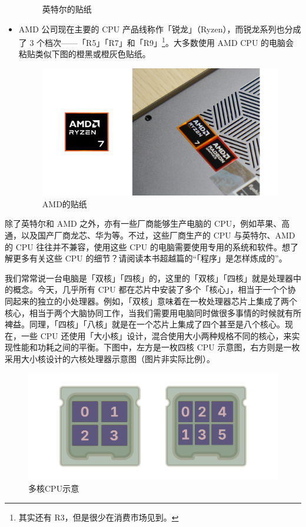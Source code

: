 \begin{itemize}
\begin{figure}[htb!]
      \caption{英特尔的贴纸}
      \label{fig:Intel_sticker}
    \end{figure}
  \item AMD 公司现在主要的 CPU 产品线称作「锐龙」（Ryzen），而锐龙系列也分成了 3 个档次——「R5」「R7」和「R9」\footnote{其实还有 R3，但是很少在消费市场见到。}。大多数使用 AMD CPU 的电脑会粘贴类似下图的橙黑或橙灰色贴纸。
    \begin{figure}[htb!]
      \centering
      \includegraphics[width=.6\textwidth]{assets/basic/AMD_sticker.png}
      \caption{AMD的贴纸}
      \label{fig:AMD_sticker}
    \end{figure}
\end{itemize}

\begin{note}
  除了英特尔和 AMD 之外，亦有一些厂商能够生产电脑的 CPU，例如苹果、高通，以及国产厂商龙芯、华为等。不过，这些厂商生产的 CPU 与英特尔、AMD 的 CPU 往往并不兼容，使用这些 CPU 的电脑需要使用专用的系统和软件。想了解更多有关这些 CPU 的细节？请阅读本书超越篇的“「程序」是怎样炼成的”。
\end{note}

我们常常说一台电脑是「双核」「四核」的，这里的「双核」「四核」就是处理器中的概念。今天，几乎所有 CPU 都在芯片中安装了多个「核心」，相当于一个个协同起来的独立的小处理器。例如，「双核」意味着在一枚处理器芯片上集成了两个核心，相当于两个大脑协同工作，当我们需要用电脑同时做很多事情的时候就有所裨益。同理，「四核」「八核」就是在一个芯片上集成了四个甚至是八个核心。现在，一些 CPU 还使用「大小核」设计，混合使用大小两种规格不同的核心，来实现性能和功耗之间的平衡。下图中，左方是一枚四核 CPU 示意图，右方则是一枚采用大小核设计的六核处理器示意图（图片非实际比例）。

\begin{figure}[htb!]
  \centering
  \includegraphics[width=.6\textwidth]{assets/basic/Multicore.pdf}
  \caption{多核CPU示意}
  \label{fig:Multicore}
\end{figure}

